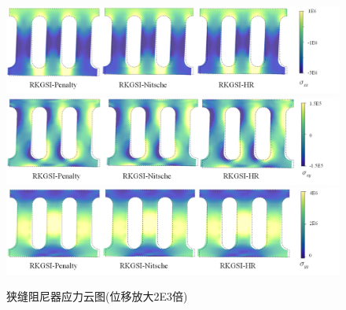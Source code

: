 \begin{figure}[H]
    \centering
        \includegraphics[scale=0.5]{figure/DAMPER/slit/M11.png}
        \includegraphics[scale=0.5]{figure/DAMPER/slit/M12.png}
        \includegraphics[scale=0.5]{figure/DAMPER/slit/M22.png}
    \caption{狭缝阻尼器应力云图(位移放大2E3倍)}\label{slitM}
\end{figure}
\newpage
